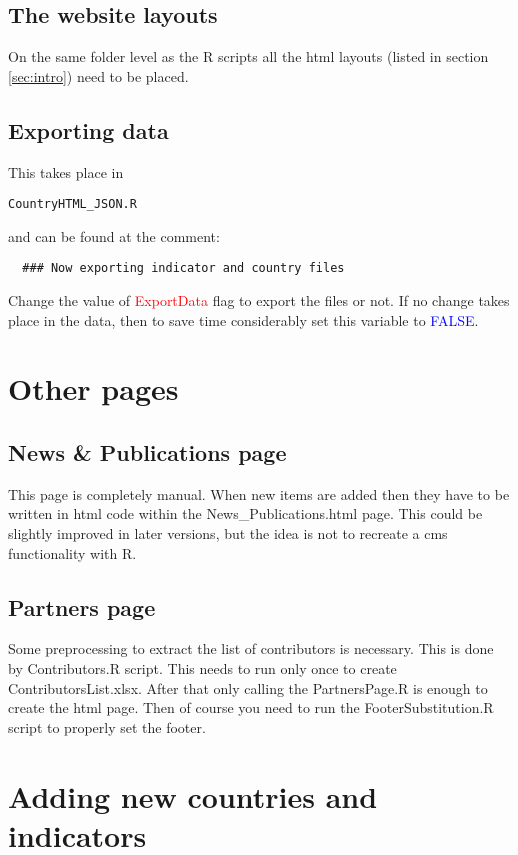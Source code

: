 \documentclass[a4paper]{article}
\begin{document}
\subsection{The website layouts}

On the same folder level as the R scripts all the html layouts (listed in 
section \ref{sec:intro}) need to be placed.

\subsection{Exporting data}
 This takes place in \begin{verbatim}CountryHTML_JSON.R\end{verbatim} and can 
be found at the comment: 
 \begin{verbatim}
  ### Now exporting indicator and country files
 \end{verbatim}

Change the value of \textcolor{red}{ExportData} flag to export the files or 
not. If no change takes place in the data, then to save time considerably set 
this variable to \textcolor{blue}{FALSE}.

\section{Other pages}
\subsection{News \& Publications page}
This page is completely manual. When new items are added then they have to be 
written in html code within the News\_Publications.html page. This could be 
slightly improved in later versions, but the idea is not to recreate a cms 
functionality with R.

\subsection{Partners page}

Some preprocessing to extract the list of contributors is necessary. This is 
done by Contributors.R script. This needs to run only once to create 
ContributorsList.xlsx. After that only calling the PartnersPage.R is enough to 
create the html page. Then of course you need to run the FooterSubstitution.R 
script to properly set the footer.

\section{Adding new countries and indicators}
\end{document}
